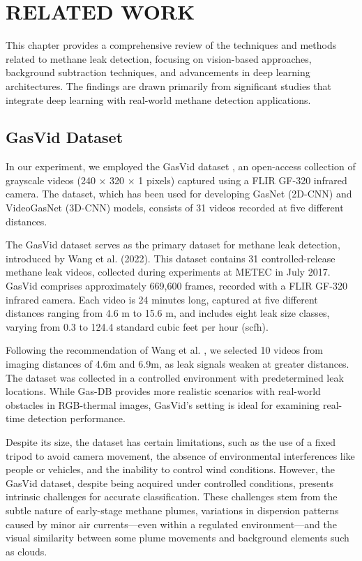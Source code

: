 \chapter{RELATED WORK}

This chapter provides a comprehensive review of the techniques and methods related to methane leak detection, focusing on vision-based approaches, background subtraction techniques, and advancements in deep learning architectures. The findings are drawn primarily from significant studies that integrate deep learning with real-world methane detection applications.

\section{GasVid Dataset}

In our experiment, we employed the GasVid dataset \cite{wang2020machine}, an open-access collection of grayscale videos (240 × 320 × 1 pixels) captured using a FLIR GF-320 infrared camera. The dataset, which has been used for developing GasNet (2D-CNN) \cite{wang2020machine} and VideoGasNet (3D-CNN) \cite{wang2022videogasnet} models, consists of 31 videos recorded at five different distances.

The GasVid dataset serves as the primary dataset for methane leak detection, introduced by Wang et al. (2022). This dataset contains 31 controlled-release methane leak videos, collected during experiments at METEC in July 2017. GasVid comprises approximately 669,600 frames, recorded with a FLIR GF-320 infrared camera. Each video is 24 minutes long, captured at five different distances ranging from 4.6 m to 15.6 m, and includes eight leak size classes, varying from 0.3 to 124.4 standard cubic feet per hour (scfh).

Following the recommendation of Wang et al. \cite{wang2022videogasnet}, we selected 10 videos from imaging distances of 4.6m and 6.9m, as leak signals weaken at greater distances. The dataset was collected in a controlled environment with predetermined leak locations. While Gas-DB \cite{wang2024invisible} provides more realistic scenarios with real-world obstacles in RGB-thermal images, GasVid's setting is ideal for examining real-time detection performance.

Despite its size, the dataset has certain limitations, such as the use of a fixed tripod to avoid camera movement, the absence of environmental interferences like people or vehicles, and the inability to control wind conditions. However, the GasVid dataset, despite being acquired under controlled conditions, presents intrinsic challenges for accurate classification. These challenges stem from the subtle nature of early-stage methane plumes, variations in dispersion patterns caused by minor air currents—even within a regulated environment—and the visual similarity between some plume movements and background elements such as clouds.

